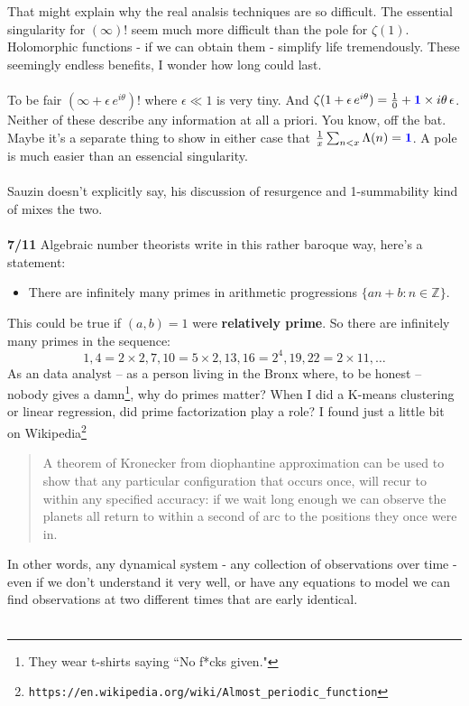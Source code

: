 \documentclass[12pt]{article}
\begin{document}
\newpage

\noindent That might explain why the real analsis techniques are so difficult. The essential singularity for $(\infty)!$ seem much more difficult than the pole for $\zeta(1)$.  Holomorphic functions - if we can obtain them - simplify life tremendously. These seemingly endless benefits, I wonder how long could last. \\ \\
To be fair $(\infty + \epsilon  \, e^{i\theta})!$ where $\epsilon \ll 1$ is very tiny.  And $\zeta(1 + \epsilon  \, e^{i\theta} ) = \frac{1}{0} +  {\color{blue}\mathbf{1}}\times i \theta \,\epsilon $.  Neither of these describe any information at all a priori.  You know, off the bat.  Maybe it's a separate thing to show in either case 
that $\frac{1}{x} \sum_{n < x} \Lambda(n) = {\color{blue}\mathbf{1}}$. A pole is much easier than an essencial singularity. \\ \\
Sauzin doesn't explicitly say, his discussion of resurgence and 1-summability kind of mixes the two. \\ \\
\textbf{7/11} Algebraic number theorists write in this rather baroque way, here's a statement:
\begin{itemize}
\item There are infinitely many primes in arithmetic progressions $\{ an+b : n \in \mathbb{Z}\}$.  
\end{itemize}
This could be true if $(a,b) = 1$ were \textbf{relatively prime}. So there are infinitely many primes in the sequence:
$$ 1, 4 = 2 \times 2, 7, 10 = 5 \times 2, 13, 16 = 2^4, 19, 22 = 2 \times 11, \dots  $$
As an data analyst -- as a person living in the Bronx where, to be honest -- nobody gives a damn\footnote{They wear t-shirts saying ``No f*cks given."}, {\color{orange!80!green}why do primes matter}?  When I did a K-means clustering or linear regression, did prime factorization play a role? I found just a little bit on Wikipedia\footnote{\texttt{https://en.wikipedia.org/wiki/Almost\_{}periodic\_{}function}}
\begin{quotation}
 A theorem of Kronecker from diophantine approximation can be used to show that any particular configuration that occurs once, will recur to within any specified accuracy: if we wait long enough we can observe the planets all return to within a second of arc to the positions they once were in.
\end{quotation} 
In other words, any dynamical system - any collection of observations over time - even if we don't understand it very well, or have any equations to model we can find observations at two different times that are early identical. \\ \\
\end{document}
